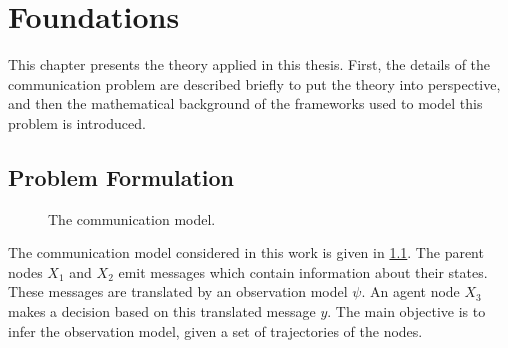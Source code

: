\chapter{Foundations}
\label{chap:2}

This chapter presents the theory applied in this thesis. First, the details of the communication problem are described briefly to put the theory into perspective, and then the mathematical background of the frameworks used to model this problem is introduced. 

\section{Problem Formulation}
\label{sec:prob_formulation}

\begin{figure}
	\centering
	\vspace{20pt}
	\caption{The communication model.}
	\label{fig:graph_model}
\end{figure}
The communication model considered in this work is given in \cref{fig:graph_model}. The parent nodes $X_{1}$ and $ X_{2}$ emit messages which contain information about their states. These messages are translated by an observation model $\psi$. An agent node $ X_{3} $ makes a decision based on this translated message $ y $. The main objective is to infer the observation model, given a set of trajectories of the nodes.\par
